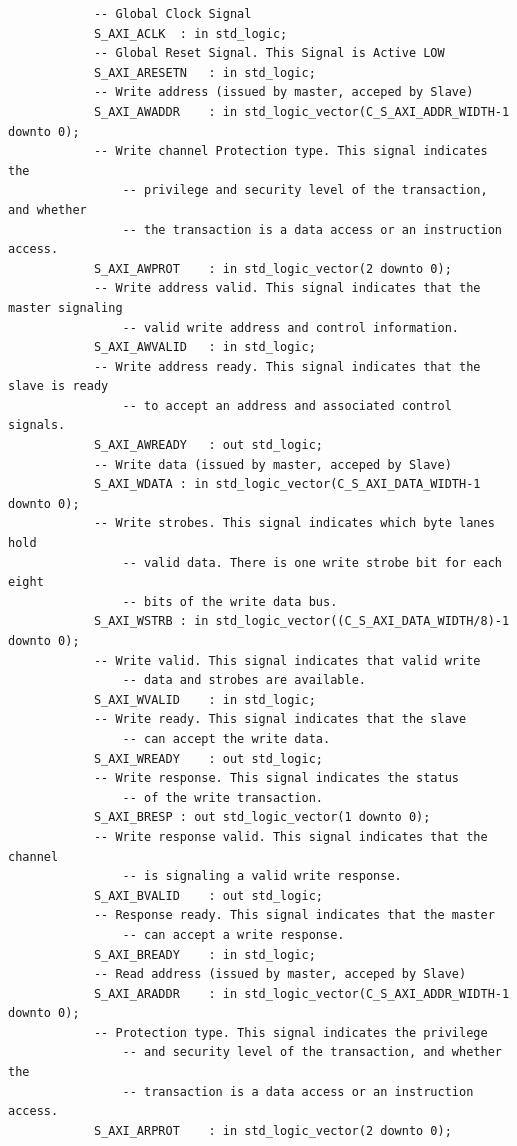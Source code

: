 \begin{verbatim}
            -- Global Clock Signal
            S_AXI_ACLK	: in std_logic;
            -- Global Reset Signal. This Signal is Active LOW
            S_AXI_ARESETN	: in std_logic;
            -- Write address (issued by master, acceped by Slave)
            S_AXI_AWADDR	: in std_logic_vector(C_S_AXI_ADDR_WIDTH-1 downto 0);
            -- Write channel Protection type. This signal indicates the
                -- privilege and security level of the transaction, and whether
                -- the transaction is a data access or an instruction access.
            S_AXI_AWPROT	: in std_logic_vector(2 downto 0);
            -- Write address valid. This signal indicates that the master signaling
                -- valid write address and control information.
            S_AXI_AWVALID	: in std_logic;
            -- Write address ready. This signal indicates that the slave is ready
                -- to accept an address and associated control signals.
            S_AXI_AWREADY	: out std_logic;
            -- Write data (issued by master, acceped by Slave) 
            S_AXI_WDATA	: in std_logic_vector(C_S_AXI_DATA_WIDTH-1 downto 0);
            -- Write strobes. This signal indicates which byte lanes hold
                -- valid data. There is one write strobe bit for each eight
                -- bits of the write data bus.    
            S_AXI_WSTRB	: in std_logic_vector((C_S_AXI_DATA_WIDTH/8)-1 downto 0);
            -- Write valid. This signal indicates that valid write
                -- data and strobes are available.
            S_AXI_WVALID	: in std_logic;
            -- Write ready. This signal indicates that the slave
                -- can accept the write data.
            S_AXI_WREADY	: out std_logic;
            -- Write response. This signal indicates the status
                -- of the write transaction.
            S_AXI_BRESP	: out std_logic_vector(1 downto 0);
            -- Write response valid. This signal indicates that the channel
                -- is signaling a valid write response.
            S_AXI_BVALID	: out std_logic;
            -- Response ready. This signal indicates that the master
                -- can accept a write response.
            S_AXI_BREADY	: in std_logic;
            -- Read address (issued by master, acceped by Slave)
            S_AXI_ARADDR	: in std_logic_vector(C_S_AXI_ADDR_WIDTH-1 downto 0);
            -- Protection type. This signal indicates the privilege
                -- and security level of the transaction, and whether the
                -- transaction is a data access or an instruction access.
            S_AXI_ARPROT	: in std_logic_vector(2 downto 0);

\end{verbatim}
